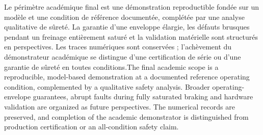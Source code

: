 \documentclass[11pt,a4paper,oneside]{report}
\newcommand{\bi}[2]{\iffrench #2\else #1\fi}
\begin{document}
\bi{The final academic scope is a reproducible, model-based demonstration at a documented reference operating condition, complemented by a qualitative safety analysis. Broader operating-envelope guarantees, abrupt faults during fully saturated braking and hardware validation are organized as future perspectives. The numerical records are preserved, and completion of the academic demonstrator is distinguished from production certification or an all-condition safety claim.}{Le périmètre académique final est une démonstration reproductible fondée sur un modèle et une condition de référence documentée, complétée par une analyse qualitative de sûreté. La garantie d'une enveloppe élargie, les défauts brusques pendant un freinage entièrement saturé et la validation matérielle sont structurés en perspectives. Les traces numériques sont conservées ; l'achèvement du démonstrateur académique se distingue d'une certification de série ou d'une garantie de sûreté en toutes conditions.}
\end{document}
